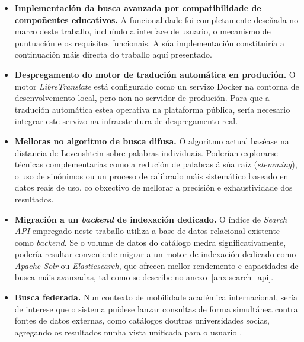 \documentclass[%
    a4paper,               %
    twoside,               %
    10pt,                  %
]{article}                 %
\begin{document}
\begin{itemize}
    \item \textbf{Implementación da busca avanzada por compatibilidade de compoñentes educativos.} A funcionalidade foi completamente deseñada no marco deste traballo, incluíndo a interface de usuario, o mecanismo de puntuación e os requisitos funcionais. A súa implementación constituiría a continuación máis directa do traballo aquí presentado.

    \item \textbf{Despregamento do motor de tradución automática en produción.} O motor \textit{LibreTranslate} está configurado como un servizo Docker na contorna de desenvolvemento local, pero non no servidor de produción. Para que a tradución automática estea operativa na plataforma pública, sería necesario integrar este servizo na infraestrutura de despregamento real.

    \item \textbf{Melloras no algoritmo de busca difusa.} O algoritmo actual baséase na distancia de Levenshtein sobre palabras individuais. Poderían explorarse técnicas complementarias como a redución de palabras á súa raíz (\textit{stemming}), o uso de sinónimos ou un proceso de calibrado máis sistemático baseado en datos reais de uso, co obxectivo de mellorar a precisión e exhaustividade dos resultados.

    \item \textbf{Migración a un \textit{backend} de indexación dedicado.} O índice de \textit{Search API} empregado neste traballo utiliza a base de datos relacional existente como \textit{backend}. Se o volume de datos do catálogo medra significativamente, podería resultar conveniente migrar a un motor de indexación dedicado como \textit{Apache Solr} ou \textit{Elasticsearch}, que ofrecen mellor rendemento e capacidades de busca máis avanzadas, tal como se describe no anexo~\ref{anx:search_api}.

    \item \textbf{Busca federada.} Nun contexto de mobilidade académica internacional, sería de interese que o sistema puidese lanzar consultas de forma simultánea contra fontes de datos externas, como catálogos doutras universidades socias, agregando os resultados nunha vista unificada para o usuario \cite{shokouhi2011}.
\end{itemize}

{\small


}
\clearpage
\end{document}
